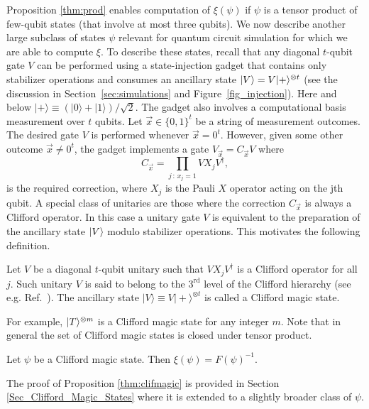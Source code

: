 Proposition \ref{thm:prod} enables computation of $\xi(\psi)$ if $\psi$ is a tensor product of
few-qubit states (that involve at most three qubits).
We now describe another large subclass of states $\psi$ relevant for quantum circuit simulation for which we are able to compute $\xi$. To describe these states, 
recall that any diagonal $t$-qubit gate $V$ can be performed using 
a state-injection gadget that contains only stabilizer operations and consumes an ancillary state
$\vert V\rangle=V\vert+\rangle^{\otimes t}$ (see the discussion in Section~\ref{sec:simulations} and Figure~\ref{fig_injection}). Here and below $|+\rangle \equiv (|0\rangle + |1\rangle)/\sqrt{2}$.
The gadget also involves a computational basis measurement over $t$ qubits. Let $\vec{x}\in \{0,1\}^t$ be a string of measurement outcomes.
The desired gate $V$ is performed whenever $\vec{x}=0^t$.
However, given some other outcome $\vec{x}\ne 0^t$,
the gadget implements a gate  $V_\vec{x}=C_\vec{x} V$ where 
\[
C_\vec{x}=\prod_{j\, : \, x_j=1} VX_jV^\dag ,
\]
is the required correction, where $X_j$ is the Pauli $X$ operator acting on the jth qubit.
A special class of unitaries are those where the correction $C_\vec{x}$ is always a Clifford operator.
In this case a unitary gate $V$ is equivalent to the preparation of the ancillary state $|V\rangle$
modulo stabilizer operations. 
This motivates the following definition.

\begin{dfn}
\label{Dfn_CMS}
Let $V$ be a diagonal $t$-qubit unitary such that $V X_j V^\dagger$ is a Clifford operator for all 
$j$. Such unitary $V$ is said to belong to the $3^{\mathrm{rd}}$ level of the Clifford hierarchy (see e.g. Ref.~\cite{CliffHier}).   The ancillary state  $\vert V \rangle \equiv V \vert +\rangle^{\otimes t}$ is called
a Clifford magic state. 
\end{dfn}
\noindent
For example, $|T\rangle^{\otimes m}$   is a Clifford magic state for any integer $m$.
Note that in general the set of Clifford magic states is closed under tensor product. 
\begin{prop}
Let $\psi$ be a Clifford magic state. Then 
$\xi(\psi)=F(\psi)^{-1}$.
	\label{thm:clifmagic}
\end{prop} 
The proof of Proposition \ref{thm:clifmagic} is provided in Section \ref{Sec_Clifford_Magic_States} where it is extended to a slightly broader class of $\psi$. 

